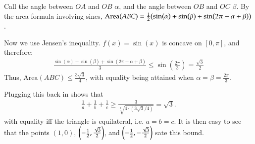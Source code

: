 \documentclass[12pt]{article}
\theoremstyle{definitionstyle}
\newcommand{\1}{\mathds 1}
\newcommand{\Area}{\mathrm{Area}}
\begin{document}
\begin{enumerate}
\begin{center}
        \end{center}
        Call the angle between $OA$ and $OB$ $\alpha$, and the angle between $OB$ and $OC$ $\beta$. By the area formula involving sines, $\Area(ABC) = \frac 12 \qty(\sin(\alpha) + \sin(\beta) + \sin(2\pi - \alpha+\beta))$. 

        Now we use Jensen's inequality. $f(x) = \sin(x)$ is concave on $[0,\pi]$, and therefore:
        \begin{align*}
            \frac{\sin(\alpha) + \sin(\beta) + \sin(2\pi - \alpha+\beta)}{3} \leq \sin(\frac{2\pi}{3}) = \frac{\sqrt{3}}{2}
        \end{align*}
        Thus, $\Area(ABC) \leq \frac{3\sqrt{3}}{4}$, with equality being attained when $\alpha = \beta = \frac{2\pi}{3}$. 

        Plugging this back in shows that 
        \begin{align*}
            \frac{1}a + \frac 1b + \frac 1c \geq \frac{3}{\sqrt[3]{4 \cdot (3\sqrt{3}/4)}} = \sqrt{3}. 
        \end{align*}
        with equality iff the triangle is equilateral, i.e. $a = b = c$. It is then easy to see that the points $(1, 0)$, $\qty(-\frac 12, \frac{\sqrt{3}}{2})$, and $\qty(-\frac 12, -\frac{\sqrt{3}}{2})$ sate this bound.
    \end{enumerate}
\end{document}
